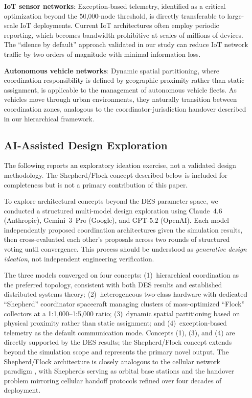 \documentclass[journal]{IEEEtran}
\begin{document}
\textbf{IoT sensor networks}: Exception-based telemetry, identified as a critical optimization beyond the 50{,}000-node threshold, is directly transferable to large-scale IoT deployments. Current IoT architectures often employ periodic reporting, which becomes bandwidth-prohibitive at scales of millions of devices. The ``silence by default'' approach validated in our study can reduce IoT network traffic by two orders of magnitude with minimal information loss.

\textbf{Autonomous vehicle networks}: Dynamic spatial partitioning, where coordination responsibility is defined by geographic proximity rather than static assignment, is applicable to the management of autonomous vehicle fleets. As vehicles move through urban environments, they naturally transition between coordination zones, analogous to the coordinator-jurisdiction handover described in our hierarchical framework.

\subsection{AI-Assisted Design Exploration}

The following reports an exploratory ideation exercise, not a validated design methodology. The Shepherd/Flock concept described below is included for completeness but is not a primary contribution of this paper.

To explore architectural concepts beyond the DES parameter space, we conducted a structured multi-model design exploration using Claude~4.6 (Anthropic), Gemini~3~Pro (Google), and GPT-5.2 (OpenAI). Each model independently proposed coordination architectures given the simulation results, then cross-evaluated each other's proposals across two rounds of structured voting until convergence. This process should be understood as \emph{generative design ideation}, not independent engineering verification.

The three models converged on four concepts: (1)~hierarchical coordination as the preferred topology, consistent with both DES results and established distributed systems theory; (2)~heterogeneous two-class hardware with dedicated ``Shepherd'' coordinator spacecraft managing clusters of mass-optimized ``Flock'' collectors at a 1:1{,}000--1:5{,}000 ratio; (3)~dynamic spatial partitioning based on physical proximity rather than static assignment; and (4)~exception-based telemetry as the default communication mode. Concepts (1), (3), and (4) are directly supported by the DES results; the Shepherd/Flock concept extends beyond the simulation scope and represents the primary novel output. The Shepherd/Flock architecture is closely analogous to the cellular network paradigm \cite{rappaport_wireless}, with Shepherds serving as orbital base stations and the handover problem mirroring cellular handoff protocols refined over four decades of deployment.
\end{document}
